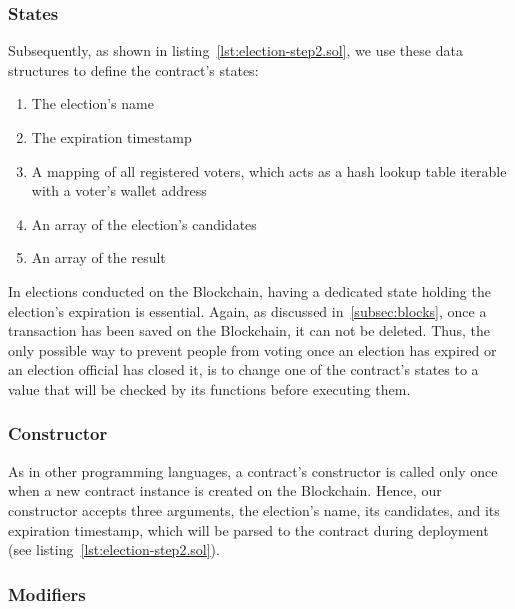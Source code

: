 
\subsubsection{States}

Subsequently, as shown in listing~\ref{lst:election-step2.sol}, we use these data structures to define the contract's states: 

\begin{enumerate}
    \item The election's name
    \item The expiration timestamp
    \item A mapping of all registered voters, which acts as a hash lookup table iterable with a voter's wallet address~\autocite[137]{antonopoulos_mastering_2019}
    \item An array of the election's candidates
    \item An array of the result
\end{enumerate}

In elections conducted on the \gls{Blockchain}, having a dedicated state holding the election's expiration is essential.
Again, as discussed in~\cref{subsec:blocks}, once a transaction has been saved on the \gls{Blockchain}, it can not be deleted.
Thus, the only possible way to prevent people from voting once an election has expired or an election official has closed it, is to change one of the contract's states to a value that will be checked by its functions before executing them.

\subsubsection{Constructor}

As in other programming languages, a contract's constructor is called only once when a new contract instance is created on the \gls{Blockchain}.
Hence, our constructor accepts three arguments, the election's name, its candidates, and its expiration timestamp, which will be parsed to the contract during deployment (see listing~\ref{lst:election-step2.sol}).

\subsubsection{Modifiers}

